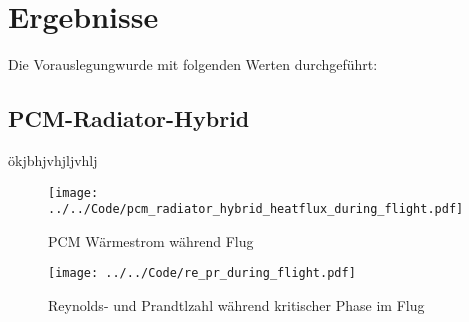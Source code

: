 \chapter{Ergebnisse}\label{chap:Ergebnisse}
Die Vorauslegungwurde mit folgenden Werten durchgeführt:

\section{PCM-Radiator-Hybrid}\label{sec:pcmRadiatorHybridErgebnisse}
ökjbhjvhjljvhlj
\begin{figure}[H]
  \centering
  \texttt{[image: ../../Code/pcm\_radiator\_hybrid\_heatflux\_during\_flight.pdf]}\label{fig:pcm_waermestrom_flugsimulation}
  \caption{PCM Wärmestrom während Flug}
  \texttt{[image: ../../Code/re\_pr\_during\_flight.pdf]}\label{fig:re_pr_flugsimulation}
  \caption{Reynolds- und Prandtlzahl während kritischer Phase im Flug}
\end{figure}
